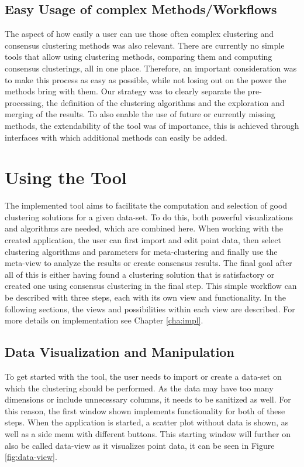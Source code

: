 \documentclass[
	a4paper,
	english,
	twoside,
	openright,               
	11pt                            
	]{report}
\begin{document}
\section{Easy Usage of complex Methods/Workflows}
The aspect of how easily a user can use those often complex clustering and consensus clustering methods was also relevant. There are currently no simple tools that allow using clustering methods, comparing them and computing consensus clusterings, all in one place. Therefore, an important consideration was to make this process as easy as possible, while not losing out on the power the methods bring with them. Our strategy was to clearly separate the pre-processing, the definition of the clustering algorithms and the exploration and merging of the results. To also enable the use of future or currently missing methods, the extendability of the tool was of importance, this is achieved through interfaces with which additional methods can easily be added.

\chapter{Using the Tool}\label{cha:Tool}
The implemented tool aims to facilitate the computation and selection of good clustering solutions for a given data-set. To do this, both powerful visualizations and algorithms are needed, which are combined here. When working with the created application, the user can first import and edit point data, then select clustering algorithms and parameters for meta-clustering and finally use the meta-view to analyze the results or create consensus results. The final goal after all of this is either having found a clustering solution that is satisfactory or created one using consensus clustering in the final step. This simple workflow can be described with three steps, each with its own view and functionality. In the following sections, the views and possibilities within each view are described. For more details on implementation see Chapter \ref{cha:impl}.

\section{Data Visualization and Manipulation}
To get started with the tool, the user needs to import or create a data-set on which the clustering should be performed. As the data may have too many dimensions or include unnecessary columns, it needs to be sanitized as well. For this reason, the first window shown implements functionality for both of these steps. When the application is started, a scatter plot without data is shown, as well as a side menu with different buttons. This starting window will further on also be called data-view as it visualizes point data, it can be seen in Figure \ref{fig:data-view}. 
\end{document}
